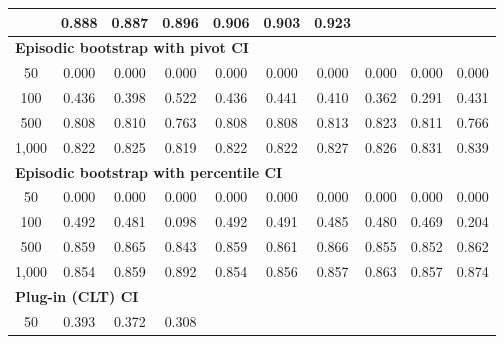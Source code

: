 \documentclass{article}
\numberwithin{equation}{section}
\begin{document}
\begin{table}[ht]
\begin{tabular}{c|ccc|cccccc}
& \cellcolor{covheat!94!white}0.888 & \cellcolor{covheat!94!white}0.887 & \cellcolor{covheat!98!white}0.896 & \cellcolor{covheat!100!white}0.906 & \cellcolor{covheat!100!white}0.903 & \cellcolor{covheat!100!white}0.923 \\
\hline
\multicolumn{10}{l}{\textbf{Episodic bootstrap with pivot CI}} \\ \hline
50
& 0.000 & 0.000 & 0.000
& 0.000 & 0.000 & 0.000 & 0.000 & 0.000 & 0.000 \\
100
& 0.436 & 0.398 & 0.522
& 0.436 & 0.441 & 0.410 & 0.362 & 0.291 & 0.431 \\
500
& \cellcolor{covheat!54!white}0.808 & \cellcolor{covheat!55!white}0.810 & \cellcolor{covheat!32!white}0.763
& \cellcolor{covheat!54!white}0.808 & \cellcolor{covheat!54!white}0.808 & \cellcolor{covheat!56!white}0.813 & \cellcolor{covheat!61!white}0.823 & \cellcolor{covheat!56!white}0.811 & \cellcolor{covheat!33!white}0.766 \\
1{,}000
& \cellcolor{covheat!61!white}0.822 & \cellcolor{covheat!62!white}0.825 & \cellcolor{covheat!59!white}0.819
& \cellcolor{covheat!61!white}0.822 & \cellcolor{covheat!61!white}0.822 & \cellcolor{covheat!63!white}0.827 & \cellcolor{covheat!63!white}0.826 & \cellcolor{covheat!65!white}0.831 & \cellcolor{covheat!69!white}0.839 \\
\hline
\multicolumn{10}{l}{\textbf{Episodic bootstrap with percentile CI}} \\ \hline
50
& 0.000 & 0.000 & 0.000
& 0.000 & 0.000 & 0.000 & 0.000 & 0.000 & 0.000 \\
100
& 0.492 & 0.481 & 0.098
& 0.492 & 0.491 & 0.485 & 0.480 & 0.469 & 0.204 \\
500
& \cellcolor{covheat!80!white}0.859 & \cellcolor{covheat!82!white}0.865 & \cellcolor{covheat!71!white}0.843
& \cellcolor{covheat!80!white}0.859 & \cellcolor{covheat!80!white}0.861 & \cellcolor{covheat!83!white}0.866 & \cellcolor{covheat!77!white}0.855 & \cellcolor{covheat!76!white}0.852 & \cellcolor{covheat!81!white}0.862 \\
1{,}000
& \cellcolor{covheat!77!white}0.854 & \cellcolor{covheat!80!white}0.859 & \cellcolor{covheat!96!white}0.892
& \cellcolor{covheat!77!white}0.854 & \cellcolor{covheat!78!white}0.856 & \cellcolor{covheat!78!white}0.857 & \cellcolor{covheat!82!white}0.863 & \cellcolor{covheat!78!white}0.857 & \cellcolor{covheat!87!white}0.874 \\
\hline
\multicolumn{10}{l}{\textbf{Plug-in (CLT) CI}} \\ \hline
50
& 0.393 & 0.372 & 0.308

\end{tabular}
\end{table}
\end{document}
